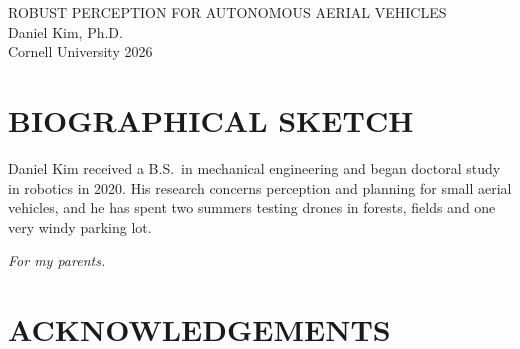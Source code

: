 \documentclass[12pt,oneside]{report}
\begin{document}

\setcounter{page}{2}


\begin{center}
\MakeUppercase{Robust Perception for Autonomous Aerial Vehicles}\\[\baselineskip]
Daniel Kim, Ph.D.\\
Cornell University 2026
\end{center}

\clearpage

\setcounter{page}{3}
\chapter*{BIOGRAPHICAL SKETCH}
Daniel Kim received a B.S.\ in mechanical engineering and began doctoral study in robotics in
2020. His research concerns perception and planning for small aerial vehicles, and he has
spent two summers testing drones in forests, fields and one very windy parking lot.
\clearpage
\begin{center}\vspace*{2in}\itshape For my parents.\end{center}
\clearpage
\chapter*{ACKNOWLEDGEMENTS}

\clearpage
\tableofcontents
\listoffigures
\listoftables
\clearpage
{}






\appendix




\end{document}

